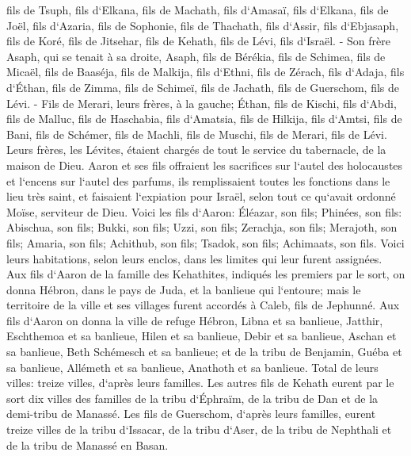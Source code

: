 \verse fils de Tsuph, fils d`Elkana, fils de Machath, fils d`Amasaï, 
\verse fils d`Elkana, fils de Joël, fils d`Azaria, fils de Sophonie, 
\verse fils de Thachath, fils d`Assir, fils d`Ebjasaph, fils de Koré, 
\verse fils de Jitsehar, fils de Kehath, fils de Lévi, fils d`Israël. - 
\verse Son frère Asaph, qui se tenait à sa droite, Asaph, fils de Bérékia, fils de Schimea, 
\verse fils de Micaël, fils de Baaséja, fils de Malkija, 
\verse fils d`Ethni, fils de Zérach, fils d`Adaja, 
\verse fils d`Éthan, fils de Zimma, fils de Schimeï, 
\verse fils de Jachath, fils de Guerschom, fils de Lévi. - 
\verse Fils de Merari, leurs frères, à la gauche; Éthan, fils de Kischi, fils d`Abdi, fils de Malluc, 
\verse fils de Haschabia, fils d`Amatsia, fils de Hilkija, 
\verse fils d`Amtsi, fils de Bani, fils de Schémer, 
\verse fils de Machli, fils de Muschi, fils de Merari, fils de Lévi. 
\verse Leurs frères, les Lévites, étaient chargés de tout le service du tabernacle, de la maison de Dieu. 
\verse Aaron et ses fils offraient les sacrifices sur l`autel des holocaustes et l`encens sur l`autel des parfums, ils remplissaient toutes les fonctions dans le lieu très saint, et faisaient l`expiation pour Israël, selon tout ce qu`avait ordonné Moïse, serviteur de Dieu. 
\verse Voici les fils d`Aaron: Éléazar, son fils; Phinées, son fils: Abischua, son fils; 
\verse Bukki, son fils; Uzzi, son fils; Zerachja, son fils; 
\verse Merajoth, son fils; Amaria, son fils; Achithub, son fils; 
\verse Tsadok, son fils; Achimaats, son fils. 
\verse Voici leurs habitations, selon leurs enclos, dans les limites qui leur furent assignées. Aux fils d`Aaron de la famille des Kehathites, indiqués les premiers par le sort, 
\verse on donna Hébron, dans le pays de Juda, et la banlieue qui l`entoure; 
\verse mais le territoire de la ville et ses villages furent accordés à Caleb, fils de Jephunné. 
\verse Aux fils d`Aaron on donna la ville de refuge Hébron, Libna et sa banlieue, Jatthir, Eschthemoa et sa banlieue, 
\verse Hilen et sa banlieue, Debir et sa banlieue, 
\verse Aschan et sa banlieue, Beth Schémesch et sa banlieue; 
\verse et de la tribu de Benjamin, Guéba et sa banlieue, Allémeth et sa banlieue, Anathoth et sa banlieue. Total de leurs villes: treize villes, d`après leurs familles. 
\verse Les autres fils de Kehath eurent par le sort dix villes des familles de la tribu d`Éphraïm, de la tribu de Dan et de la demi-tribu de Manassé. 
\verse Les fils de Guerschom, d`après leurs familles, eurent treize villes de la tribu d`Issacar, de la tribu d`Aser, de la tribu de Nephthali et de la tribu de Manassé en Basan. 
